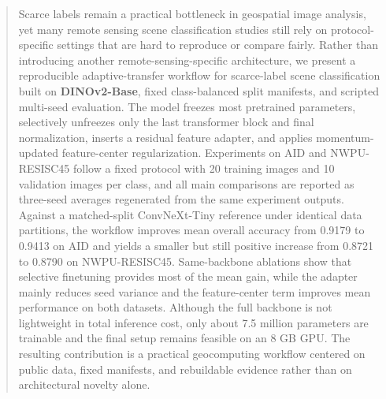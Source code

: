 \begin{abstract}
Scarce labels remain a practical bottleneck in geospatial image analysis, yet many remote sensing scene classification studies still rely on protocol-specific settings that are hard to reproduce or compare fairly. Rather than introducing another remote-sensing-specific architecture, we present a reproducible adaptive-transfer workflow for scarce-label scene classification built on \textbf{DINOv2-Base}, fixed class-balanced split manifests, and scripted multi-seed evaluation. The model freezes most pretrained parameters, selectively unfreezes only the last transformer block and final normalization, inserts a residual feature adapter, and applies momentum-updated feature-center regularization. Experiments on AID and NWPU-RESISC45 follow a fixed protocol with 20 training images and 10 validation images per class, and all main comparisons are reported as three-seed averages regenerated from the same experiment outputs. Against a matched-split ConvNeXt-Tiny reference under identical data partitions, the workflow improves mean overall accuracy from 0.9179 to 0.9413 on AID and yields a smaller but still positive increase from 0.8721 to 0.8790 on NWPU-RESISC45. Same-backbone ablations show that selective finetuning provides most of the mean gain, while the adapter mainly reduces seed variance and the feature-center term improves mean performance on both datasets. Although the full backbone is not lightweight in total inference cost, only about 7.5 million parameters are trainable and the final setup remains feasible on an 8 GB GPU. The resulting contribution is a practical geocomputing workflow centered on public data, fixed manifests, and rebuildable evidence rather than on architectural novelty alone.
\end{abstract}

